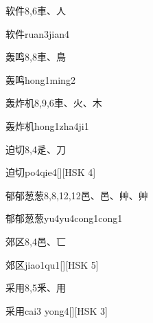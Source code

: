 \begin{entry}{软件}{8,6}{⾞、⼈}
  \begin{phonetics}{软件}{ruan3jian4}
  \end{phonetics}
\end{entry}

\begin{entry}{轰鸣}{8,8}{⾞、⿃}
  \begin{phonetics}{轰鸣}{hong1ming2}
  \end{phonetics}
\end{entry}

\begin{entry}{轰炸机}{8,9,6}{⾞、⽕、⽊}
  \begin{phonetics}{轰炸机}{hong1zha4ji1}
  \end{phonetics}
\end{entry}

\begin{entry}{迫切}{8,4}{⾡、⼑}
  \begin{phonetics}{迫切}{po4qie4}[][HSK 4]
  \end{phonetics}
\end{entry}

\begin{entry}{郁郁葱葱}{8,8,12,12}{⾢、⾢、⾋、⾋}
  \begin{phonetics}{郁郁葱葱}{yu4yu4cong1cong1}
  \end{phonetics}
\end{entry}

\begin{entry}{郊区}{8,4}{⾢、⼖}
  \begin{phonetics}{郊区}{jiao1qu1}[][HSK 5]
  \end{phonetics}
\end{entry}

\begin{entry}{采用}{8,5}{⾤、⽤}
  \begin{phonetics}{采用}{cai3 yong4}[][HSK 3]
  \end{phonetics}
\end{entry}

